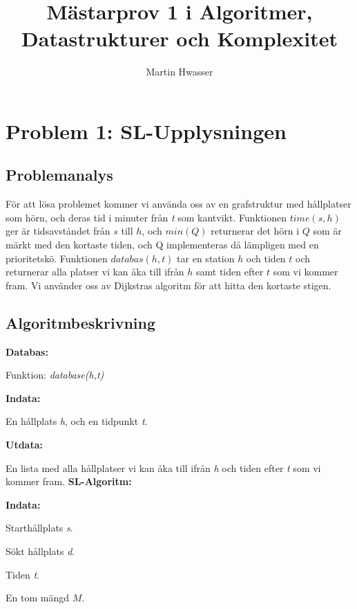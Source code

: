 \documentclass[11pt]{exam}
\title{Mästarprov 1 i Algoritmer, Datastrukturer och Komplexitet}
\author{Martin Hwasser}
\begin{document}
\maketitle
\newpage


\lstset{language=Python,numbers=left}

\vspace{0.1in} 

\section{Problem 1: SL-Upplysningen}


\subsection{Problemanalys}
För att lösa problemet kommer vi använda oss av en grafstruktur med hållplatser som hörn, och deras tid i minuter från \textit{t} som kantvikt. Funktionen $time(s,h)$ ger är tidsavståndet från $s$ till $h$, och $min(Q)$ returnerar det hörn i $Q$ som är märkt med den kortaste tiden, och Q implementeras då lämpligen med en prioritetskö. Funktionen $databas(h, t)$ tar en station $h$ och tiden $t$ och returnerar alla platser vi kan åka till ifrån $h$ samt tiden efter $t$ som vi kommer fram. Vi använder oss av Dijkstras algoritm för att hitta den kortaste stigen.
\newline \newline

\subsection{Algoritmbeskrivning}
\textbf{Databas:}

Funktion: \textit{database(h,t)}

\textbf{Indata:} 

En hållplats \textit{h}, och en tidpunkt \textit{t}. 

\textbf{Utdata:}

En lista med alla hållplatser vi kan åka till ifrån \textit{h} och tiden efter \textit{t} som vi kommer fram.
\newline
\textbf{SL-Algoritm:}

\textbf{Indata:}

Starthållplats \textit{s}.

Sökt hållplats \textit{d}.

Tiden \textit{t}.

En tom mängd $M$.
\end{document}
